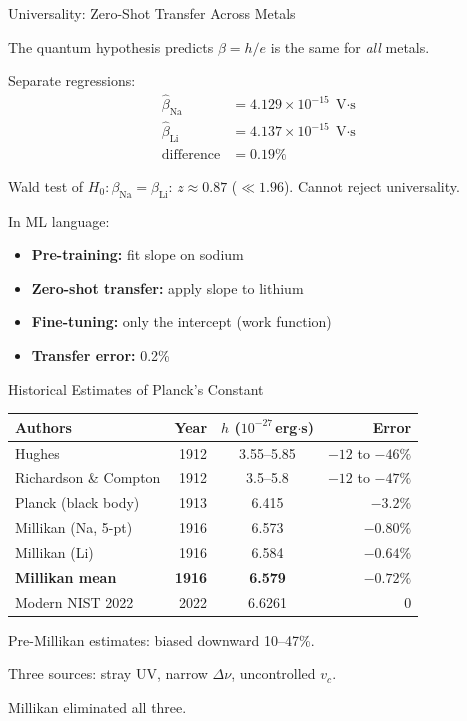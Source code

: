 \documentclass[aspectratio=169]{beamer}
\begin{document}
\begin{frame}{Universality: Zero-Shot Transfer Across Metals}

The quantum hypothesis predicts $\beta = h/e$ is the same for
\emph{all} metals.

\medskip
Separate regressions:
\begin{align*}
  \hat\beta_{\mathrm{Na}} &= 4.129\times10^{-15}\;\text{V$\cdot$s} \\
  \hat\beta_{\mathrm{Li}} &= 4.137\times10^{-15}\;\text{V$\cdot$s} \\
  \text{difference} &= 0.19\%
\end{align*}

Wald test of $H_0\colon \beta_{\mathrm{Na}} = \beta_{\mathrm{Li}}$:\quad
$z \approx 0.87$ ($\ll 1.96$). Cannot reject universality.

\medskip
In ML language:
\begin{itemize}
  \item \textbf{Pre-training:} fit slope on sodium
  \item \textbf{Zero-shot transfer:} apply slope to lithium
  \item \textbf{Fine-tuning:} only the intercept (work function)
  \item \textbf{Transfer error:} 0.2\%
\end{itemize}

\end{frame}

\begin{frame}{Historical Estimates of Planck's Constant}

\begin{center}
\begin{tabular}{p{4.4cm}rcr}
\toprule
Authors & Year & $h$ ($10^{-27}$\,erg$\cdot$s) & Error \\
\midrule
Hughes              & 1912 & 3.55--5.85 & $-12$ to $-46\%$ \\
Richardson \& Compton & 1912 & 3.5--5.8 & $-12$ to $-47\%$ \\
Planck (black body) & 1913 & 6.415     & $-3.2\%$         \\
\midrule
Millikan (Na, 5-pt) & 1916 & 6.573     & $-0.80\%$        \\
Millikan (Li)       & 1916 & 6.584     & $-0.64\%$        \\
\textbf{Millikan mean} & \textbf{1916} & \textbf{6.579} & $\mathbf{-0.72\%}$ \\
\midrule
Modern NIST 2022    & 2022 & 6.6261    & 0                \\
\bottomrule
\end{tabular}
\end{center}

\medskip
Pre-Millikan estimates: biased downward 10--47\%.

Three sources: stray UV, narrow $\Delta\nu$, uncontrolled $v_c$.

Millikan eliminated all three.

\end{frame}
\end{document}
